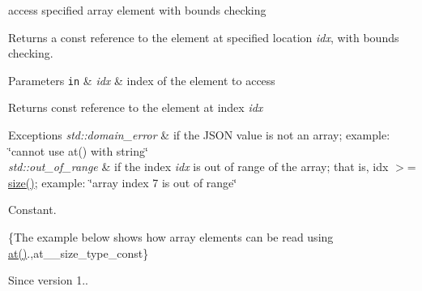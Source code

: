 access specified array element with bounds checking 

Returns a const reference to the element at specified location {\itshape idx}, with bounds checking.


\begin{DoxyParams}[1]{Parameters}
\mbox{\tt in}  & {\em idx} & index of the element to access\\
\hline
\end{DoxyParams}
\begin{DoxyReturn}{Returns}
const reference to the element at index {\itshape idx} 
\end{DoxyReturn}

\begin{DoxyExceptions}{Exceptions}
{\em std\+::domain\+\_\+error} & if the J\+S\+ON value is not an array; example\+: {\ttfamily \char`\"{}cannot use at() with string\char`\"{}} \\
\hline
{\em std\+::out\+\_\+of\+\_\+range} & if the index {\itshape idx} is out of range of the array; that is, {\ttfamily idx $>$= \hyperlink{classnlohmann_1_1basic__json_a0ea8a1ecca4b3cb0ba09ad7552c364b6}{size()}}; example\+: {\ttfamily \char`\"{}array index 7 is out of range\char`\"{}}\\
\hline
\end{DoxyExceptions}
Constant.

\{The example below shows how array elements can be read using {\ttfamily \hyperlink{classnlohmann_1_1basic__json_a214a8c22d616fd3567b88932c07436c9}{at()}}.,at\+\_\+\+\_\+size\+\_\+type\+\_\+const\}

\begin{DoxySince}{Since}
version 1.. 
\end{DoxySince}
\hypertarget{classnlohmann_1_1basic__json_a7ed92d56cb313b243c1917696ffdf074}{}\label{classnlohmann_1_1basic__json_a7ed92d56cb313b243c1917696ffdf074} 
